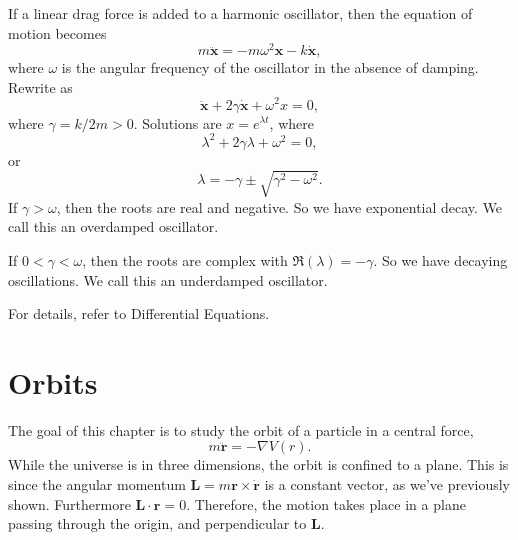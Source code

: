 \documentclass[a4paper]{article}
\begin{document}
\begin{eg}
  If a linear drag force is added to a harmonic oscillator, then the equation of motion becomes
  \[
    m\ddot{\mathbf{x}} = -m\omega^2 \mathbf{x} - k\dot{\mathbf{x}},
  \]
  where $\omega$ is the angular frequency of the oscillator in the absence of damping. Rewrite as
  \[
    \ddot{\mathbf{x}} + 2\gamma \dot{\mathbf{x}} + \omega^2 x = 0,
  \]
  where $\gamma = k/2m > 0$. Solutions are $x = e^{\lambda t}$, where
  \[
    \lambda^2 + 2\gamma \lambda + \omega^2 = 0,
  \]
  or
  \[
    \lambda = -\gamma \pm \sqrt{\gamma^2 - \omega^2}.
  \]
  If $\gamma > \omega$, then the roots are real and negative. So we have exponential decay. We call this an overdamped oscillator.

  If $0 < \gamma < \omega$, then the roots are complex with $\Re(\lambda) = -\gamma$. So we have decaying oscillations. We call this an underdamped oscillator.

  For details, refer to Differential Equations.
\end{eg}

\section{Orbits}
The goal of this chapter is to study the orbit of a particle in a central force,
\[
  m\ddot{\mathbf{r}} = -\nabla V(r).
\]
While the universe is in three dimensions, the orbit is confined to a plane. This is since the angular momentum $\mathbf{L} = m\mathbf{r}\times \dot{\mathbf{r}}$ is a constant vector, as we've previously shown. Furthermore $\mathbf{L}\cdot \mathbf{r} = 0$. Therefore, the motion takes place in a plane passing through the origin, and perpendicular to $\mathbf{L}$.
\end{document}
